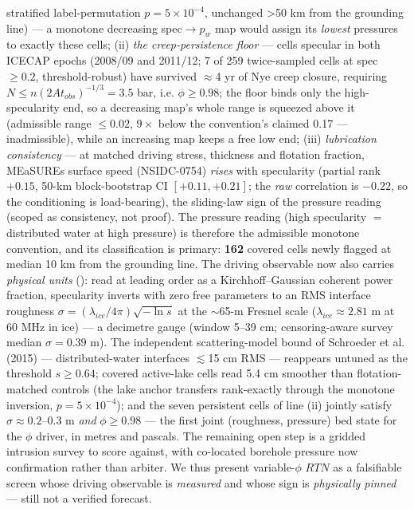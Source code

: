 \documentclass[11pt]{article}
\begin{document}
stratified label-permutation $p=5\times 10^{-4}$, unchanged >50 km from the grounding line) — a monotone decreasing spec$\to p_{w}$ map would assign its \emph{lowest} pressures to exactly these cells; (ii) \emph{the creep-persistence floor} — cells specular in both ICECAP epochs (2008/09 and 2011/12; 7 of 259 twice-sampled cells at spec $\ge 0.2$, threshold-robust) have survived $\approx $4 yr of Nye creep closure, requiring $N\le n(2At_{obs})^{-1/3}=3.5$ bar, i.e. $\phi \ge 0.98$; the floor binds only the high-specularity end, so a decreasing map's whole range is squeezed above it (admissible range $\le 0.02$, $9\times $ below the convention's claimed 0.17 — inadmissible), while an increasing map keeps a free low end; (iii) \emph{lubrication consistency} — at matched driving stress, thickness and flotation fraction, MEaSUREs surface speed (NSIDC-0754) \emph{rises} with specularity (partial rank $+0.15$, 50-km block-bootstrap CI $[+0.11,+0.21]$; the \emph{raw} correlation is $-0.22$, so the conditioning is load-bearing), the sliding-law sign of the pressure reading (scoped as consistency, not proof). The pressure reading (high specularity $=$ distributed water at high pressure) is therefore the admissible monotone convention, and its classification is primary: \textbf{162} covered cells newly flagged at median 10 km from the grounding line. The driving observable now also carries \emph{physical units} (): read at leading order as a Kirchhoff--Gaussian coherent power fraction, specularity inverts with zero free parameters to an RMS interface roughness $\sigma =(\lambda _{ice}/4\pi )\sqrt{-\ln s}$ at the $\sim $65-m Fresnel scale ($\lambda _{ice}\approx 2.81$ m at 60 MHz in ice) — a decimetre gauge (window 5--39 cm; censoring-aware survey median $\sigma =0.39$ m). The independent scattering-model bound of Schroeder et al. (2015) — distributed-water interfaces $\lesssim $15 cm RMS — reappears untuned as the threshold $s\ge 0.64$; covered active-lake cells read 5.4 cm smoother than flotation-matched controls (the lake anchor transfers rank-exactly through the monotone inversion, $p=5\times 10^{-4}$); and the seven persistent cells of line (ii) jointly satisfy $\sigma \approx 0.2$--$0.3$ m \emph{and} $\phi \ge 0.98$ — the first joint (roughness, pressure) bed state for the $\phi $ driver, in metres and pascals. The remaining open step is a gridded intrusion survey to score against, with co-located borehole pressure now confirmation rather than arbiter. We thus present variable-$\phi $ $RTN$ as a falsifiable screen whose driving observable is \emph{measured} and whose sign is \emph{physically pinned} — still not a verified forecast.
\end{document}
